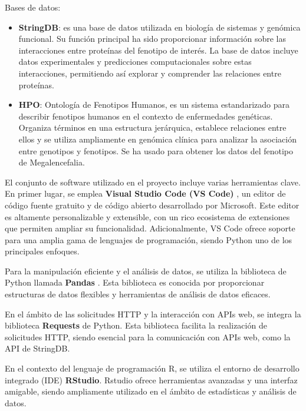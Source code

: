 Bases de datos:
\begin{itemize}
	\item \textbf{StringDB}: es una base de datos utilizada en biología de sistemas y genómica funcional. Su función principal ha sido proporcionar información sobre las interacciones entre proteínas del fenotipo de interés. La base de datos incluye datos experimentales y predicciones computacionales sobre estas interacciones, permitiendo así explorar y comprender las relaciones entre proteínas.
	\item \textbf{HPO}: Ontología de Fenotipos Humanos, es un sistema estandarizado para describir fenotipos humanos en el contexto de enfermedades genéticas. Organiza términos en una estructura jerárquica, establece relaciones entre ellos y se utiliza ampliamente en genómica clínica para analizar la asociación entre genotipos y fenotipos. Se ha usado para obtener los datos del fenotipo de Megalencefalia.
\end{itemize}


El conjunto de software utilizado en el proyecto incluye varias herramientas clave. En primer lugar, se emplea \textbf{Visual Studio Code (VS Code)} \cite{vscode}, un editor de código fuente gratuito y de código abierto desarrollado por Microsoft. Este editor es altamente personalizable y extensible, con un rico ecosistema de extensiones que permiten ampliar su funcionalidad. Adicionalmente, VS Code ofrece soporte para una amplia gama de lenguajes de programación, siendo Python uno de los principales enfoques.

Para la manipulación eficiente y el análisis de datos, se utiliza la biblioteca de Python llamada \textbf{Pandas} \cite{pandas}. Esta biblioteca es conocida por proporcionar estructuras de datos flexibles y herramientas de análisis de datos eficaces.

En el ámbito de las solicitudes HTTP y la interacción con APIs web, se integra la biblioteca \textbf{Requests} \cite{requests} de Python. Esta biblioteca facilita la realización de solicitudes HTTP, siendo esencial para la comunicación con APIs web, como la API de StringDB.

En el contexto del lenguaje de programación R, se utiliza el entorno de desarrollo integrado (IDE) \textbf{RStudio}. Rstudio \cite{rstudio} ofrece herramientas avanzadas y una interfaz amigable, siendo ampliamente utilizado en el ámbito de estadísticas y análisis de datos.

